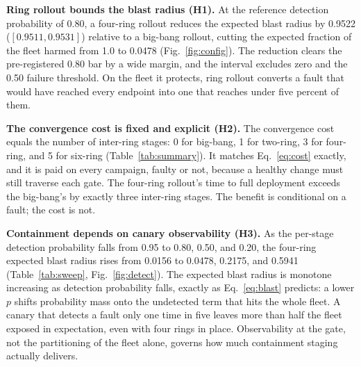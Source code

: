 \documentclass[journal]{IEEEtran}
\begin{document}
\begin{table}[t]
\centering
\caption{Expected blast radius of the reference four-ring rollout as the per-stage detection
probability varies (mean over 25 seeds).}
\label{tab:sweep}
\footnotesize
\setlength{\tabcolsep}{6pt}
\end{table}

\textbf{Ring rollout bounds the blast radius (H1).} At the reference detection probability of 0.80, a
four-ring rollout reduces the expected blast radius by 0.9522 ($[0.9511, 0.9531]$) relative to a
big-bang rollout, cutting the expected fraction of the fleet harmed from 1.0 to 0.0478
(Fig.~\ref{fig:config}). The reduction clears the pre-registered 0.80 bar by a wide margin, and the
interval excludes zero and the 0.50 failure threshold. On the fleet it protects, ring rollout
converts a fault that would have reached every endpoint into one that reaches under five percent of
them.

\textbf{The convergence cost is fixed and explicit (H2).} The convergence cost equals the number of
inter-ring stages: 0 for big-bang, 1 for two-ring, 3 for four-ring, and 5 for six-ring
(Table~\ref{tab:summary}). It matches Eq.~\eqref{eq:cost} exactly, and it is paid on every campaign,
faulty or not, because a healthy change must still traverse each gate. The four-ring rollout's time
to full deployment exceeds the big-bang's by exactly three inter-ring stages. The benefit is
conditional on a fault; the cost is not.

\textbf{Containment depends on canary observability (H3).} As the per-stage detection probability
falls from 0.95 to 0.80, 0.50, and 0.20, the four-ring expected blast radius rises from 0.0156 to
0.0478, 0.2175, and 0.5941 (Table~\ref{tab:sweep}, Fig.~\ref{fig:detect}). The expected blast radius
is monotone increasing as detection probability falls, exactly as Eq.~\eqref{eq:blast} predicts: a
lower $p$ shifts probability mass onto the undetected term that hits the whole fleet. A canary that
detects a fault only one time in five leaves more than half the fleet exposed in expectation, even
with four rings in place. Observability at the gate, not the partitioning of the fleet alone, governs
how much containment staging actually delivers.
\end{document}
